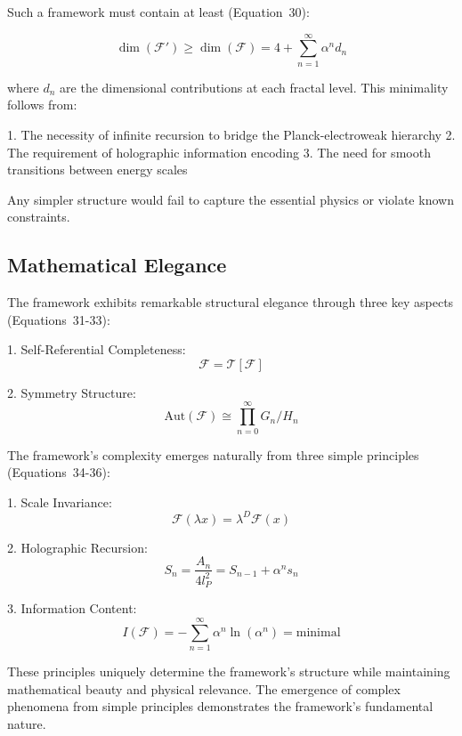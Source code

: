 \documentclass[12pt]{article}
\begin{document}
Such a framework must contain at least (Equation~30):

\begin{equation}
\dim(\mathcal{F}') \geq \dim(\mathcal{F}) = 4 + \sum_{n=1}^{\infty} \alpha^n d_n
\end{equation}

where $d_n$ are the dimensional contributions at each fractal level. This minimality follows from:

1. The necessity of infinite recursion to bridge the Planck-electroweak hierarchy
2. The requirement of holographic information encoding
3. The need for smooth transitions between energy scales

Any simpler structure would fail to capture the essential physics or violate known constraints.

\subsection{Mathematical Elegance}

The framework exhibits remarkable structural elegance through three key aspects (Equations~31-33):

1. Self-Referential Completeness:
   \begin{equation}
   \mathcal{F} = \mathcal{T}[\mathcal{F}]
   \end{equation}

2. Symmetry Structure:
   \begin{equation}
   \text{Aut}(\mathcal{F}) \cong \prod_{n=0}^{\infty} G_n/H_n
   \end{equation}

The framework's complexity emerges naturally from three simple principles (Equations~34-36):

1. Scale Invariance:
   \begin{equation}
   \mathcal{F}(\lambda x) = \lambda^D \mathcal{F}(x)
   \end{equation}

2. Holographic Recursion:
   \begin{equation}
   S_n = \frac{A_n}{4l_P^2} = S_{n-1} + \alpha^n s_n
   \end{equation}

3. Information Content:
   \begin{equation}
   I(\mathcal{F}) = -\sum_{n=1}^{\infty} \alpha^n \ln(\alpha^n) = \text{minimal}
   \end{equation}

These principles uniquely determine the framework's structure while maintaining mathematical beauty and physical relevance. The emergence of complex phenomena from simple principles demonstrates the framework's fundamental nature.
\end{document}
